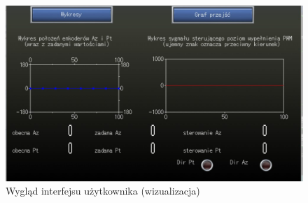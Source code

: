  \begin{figure}[h]
    \centering
    \includegraphics[width=160mm]{../images/laby/wizualizacja_tras.jpg}
    \caption{Wygląd interfejsu użytkownika (wizualizacja)}
    \end{figure}  
